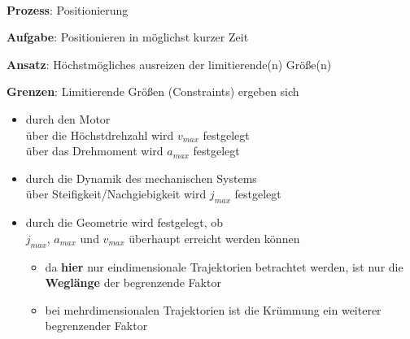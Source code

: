 \STANDARD{\insertsection}
{ 
  \framesubtitle{\insertsubsection}

  \textbf{Prozess}: Positionierung

  \textbf{Aufgabe}: Positionieren in möglichst kurzer Zeit

  \textbf{Ansatz}: Höchstmögliches ausreizen der limitierende(n) Größe(n)

  \textbf{Grenzen}: Limitierende Größen (Constraints) ergeben sich

  \begin{itemize}
    \item durch den Motor
          \\über die Höchstdrehzahl wird $v_{max}$ festgelegt
          \\über das Drehmoment wird $a_{max}$ festgelegt
    \item durch die Dynamik des mechanischen Systems
          \\über Steifigkeit/Nachgiebigkeit wird $j_{max}$ festgelegt
    \item durch die Geometrie wird festgelegt, ob
          \\$j_{max}$, $a_{max}$ und $v_{max}$ überhaupt erreicht werden können
      \begin{itemize}
        \item da \textbf{hier} nur eindimensionale Trajektorien betrachtet werden, ist nur die \textbf{Weglänge} der begrenzende Faktor
        \item bei mehrdimensionalen Trajektorien ist die Krümmung ein weiterer begrenzender Faktor
      \end{itemize}
  \end{itemize}
}